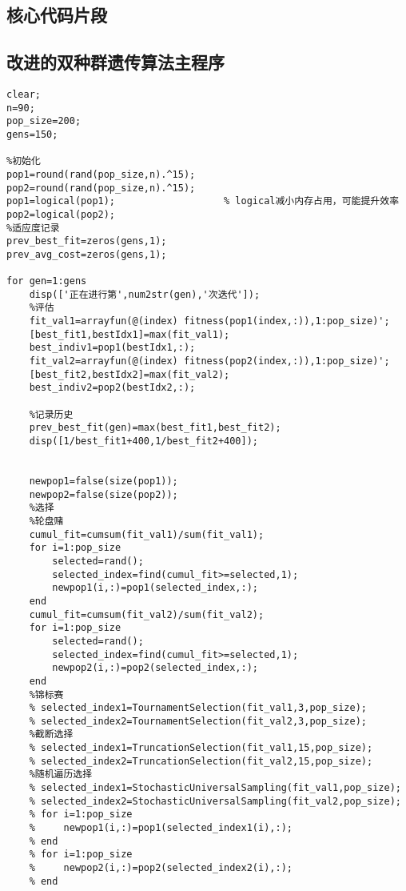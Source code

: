 \documentclass[withoutpreface,bwprint]{cumcmthesis} %
\begin{document}
\newpage
\begin{appendices}

\section{核心代码片段}

\subsection{改进的双种群遗传算法主程序}
\begin{lstlisting}
clear;
n=90;
pop_size=200;
gens=150;

%初始化
pop1=round(rand(pop_size,n).^15);
pop2=round(rand(pop_size,n).^15);
pop1=logical(pop1);                   % logical减小内存占用，可能提升效率
pop2=logical(pop2);
%适应度记录
prev_best_fit=zeros(gens,1);
prev_avg_cost=zeros(gens,1);

for gen=1:gens
    disp(['正在进行第',num2str(gen),'次迭代']);
    %评估
    fit_val1=arrayfun(@(index) fitness(pop1(index,:)),1:pop_size)';
    [best_fit1,bestIdx1]=max(fit_val1);
    best_indiv1=pop1(bestIdx1,:);
    fit_val2=arrayfun(@(index) fitness(pop2(index,:)),1:pop_size)';
    [best_fit2,bestIdx2]=max(fit_val2);
    best_indiv2=pop2(bestIdx2,:);
    
    %记录历史
    prev_best_fit(gen)=max(best_fit1,best_fit2);
    disp([1/best_fit1+400,1/best_fit2+400]);


    newpop1=false(size(pop1));
    newpop2=false(size(pop2));
    %选择
    %轮盘赌
    cumul_fit=cumsum(fit_val1)/sum(fit_val1);
    for i=1:pop_size
        selected=rand();
        selected_index=find(cumul_fit>=selected,1);
        newpop1(i,:)=pop1(selected_index,:);
    end
    cumul_fit=cumsum(fit_val2)/sum(fit_val2);
    for i=1:pop_size
        selected=rand();
        selected_index=find(cumul_fit>=selected,1);
        newpop2(i,:)=pop2(selected_index,:);
    end
    %锦标赛
    % selected_index1=TournamentSelection(fit_val1,3,pop_size);
    % selected_index2=TournamentSelection(fit_val2,3,pop_size);
    %截断选择
    % selected_index1=TruncationSelection(fit_val1,15,pop_size);
    % selected_index2=TruncationSelection(fit_val2,15,pop_size);
    %随机遍历选择
    % selected_index1=StochasticUniversalSampling(fit_val1,pop_size);
    % selected_index2=StochasticUniversalSampling(fit_val2,pop_size);
    % for i=1:pop_size
    %     newpop1(i,:)=pop1(selected_index1(i),:);
    % end
    % for i=1:pop_size
    %     newpop2(i,:)=pop2(selected_index2(i),:);
    % end
    

\end{lstlisting}
\end{appendices}
\end{document}
